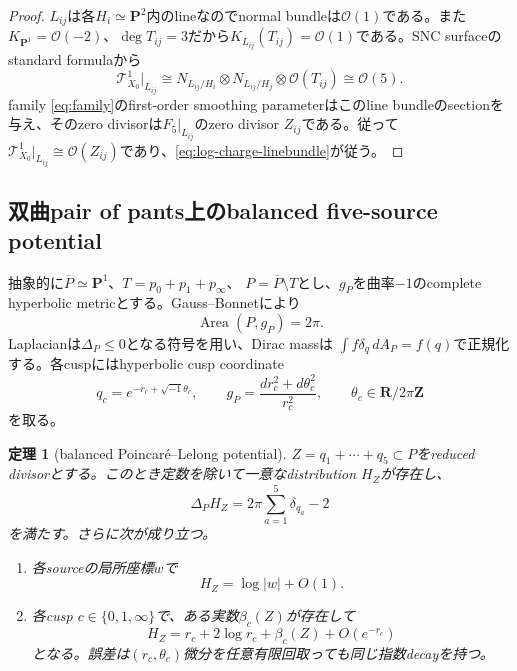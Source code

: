 \documentclass[11pt,a4paper]{ltjsarticle}
\newtheorem{theorem}{定理}[section]
\theoremstyle{definition}
\theoremstyle{remark}
\newcommand{\PP}{\mathbf P}
\newcommand{\RR}{\mathbf R}
\newcommand{\ZZ}{\mathbf Z}
\begin{document}
\begin{proof}
$L_{ij}$は各$H_i\simeq\PP^2$内のlineなのでnormal bundleは$\mathcal O(1)$である。また$K_{\PP^1}=\mathcal O(-2)$、$\deg T_{ij}=3$だから$K_{L_{ij}}(T_{ij})=\mathcal O(1)$である。SNC surfaceのstandard formulaから
\[
 \mathcal T^1_{X_0}|_{L_{ij}}
 \cong N_{L_{ij}/H_i}\otimes N_{L_{ij}/H_j}
 \otimes\mathcal O(T_{ij})\cong\mathcal O(5).
\]
family \eqref{eq:family}のfirst-order smoothing parameterはこのline bundleのsectionを与え、そのzero divisorは$F_5|_{L_{ij}}$のzero divisor $Z_{ij}$である。従って
$\mathcal T^1_{X_0}|_{L_{ij}}\cong\mathcal O(Z_{ij})$であり、\eqref{eq:log-charge-linebundle}が従う。
\end{proof}

\subsection{双曲pair of pants上のbalanced five-source potential}
\label{subsec:balanced-potential}

抽象的に$\overline P\simeq\PP^1$、$T=p_0+p_1+p_\infty$、
$P=\overline P\setminus T$とし、$g_P$を曲率$-1$のcomplete hyperbolic metricとする。Gauss--Bonnetにより
\begin{equation}\label{eq:pants-area}
 \operatorname{Area}(P,g_P)=2\pi.
\end{equation}
Laplacianは$\Delta_P\le0$となる符号を用い、Dirac massは
$\int f\delta_q\,dA_P=f(q)$で正規化する。各cuspにはhyperbolic cusp coordinate
\begin{equation}\label{eq:cusp-coordinate}
 q_c=e^{-r_c+\sqrt{-1}\theta_c},\qquad
 g_P=\frac{dr_c^2+d\theta_c^2}{r_c^2},
 \qquad \theta_c\in\RR/2\pi\ZZ
\end{equation}
を取る。

\begin{theorem}[balanced Poincaré--Lelong potential]\label{thm:balanced-five-source}
$Z=q_1+\cdots+q_5\subset P$をreduced divisorとする。このとき定数を除いて一意なdistribution $H_Z$が存在し、
\begin{equation}\label{eq:balanced-poisson}
 \Delta_PH_Z=2\pi\sum_{a=1}^5\delta_{q_a}-2
\end{equation}
を満たす。さらに次が成り立つ。
\begin{enumerate}[label=(\roman*),leftmargin=2.8em]
\item 各sourceの局所座標$w$で
\begin{equation}\label{eq:source-asymptotic}
 H_Z=\log|w|+O(1).
\end{equation}
\item 各cusp $c\in\{0,1,\infty\}$で、ある実数$\beta_c(Z)$が存在して
\begin{equation}\label{eq:cusp-balanced-asymptotic}
 H_Z=r_c+2\log r_c+\beta_c(Z)+O(e^{-r_c})
\end{equation}
となる。誤差は$(r_c,\theta_c)$微分を任意有限回取っても同じ指数decayを持つ。
\end{enumerate}
\end{theorem}
\end{document}
